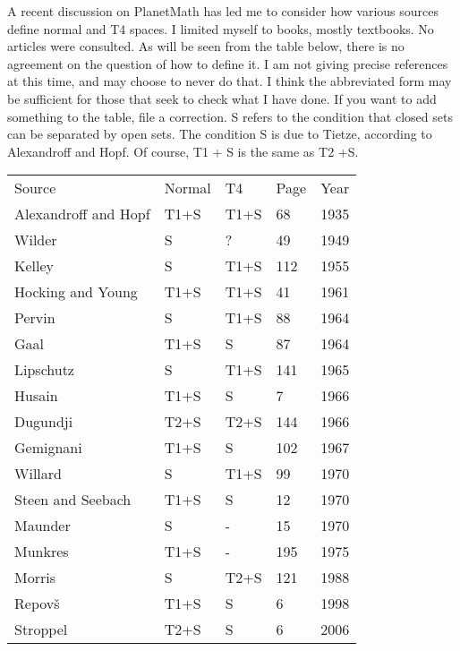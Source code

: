 \documentclass[12pt]{article}
\begin{document}
A recent discussion on PlanetMath has led me to consider how various
sources define normal and T4 spaces. I limited myself to books, mostly textbooks.
No articles were consulted. 
As will be seen from the table below, there is no agreement on
the question of how to define it. I am not giving precise references
at this time, and may choose to never do that. I think the abbreviated
form may be sufficient for those that seek to check what I have done.
If you want to add something to the table, file a correction.
S refers to the condition that closed sets can be separated by open sets.
The condition S is due to Tietze, according to Alexandroff and Hopf.
Of course, T1 + S is the same as T2 +S.

\begin{tabular}{lllll}
\hline 
Source & Normal & T4 & Page & Year \\
Alexandroff and Hopf & T1+S & T1+S & 68 & 1935 \\
Wilder & S &? & 49 & 1949 \\
Kelley & S & T1+S & 112 & 1955 \\
Hocking and Young & T1+S & T1+S & 41 &1961 \\
Pervin & S & T1+S & 88 & 1964 \\
Gaal & T1+S & S & 87 & 1964 \\
Lipschutz & S & T1+S & 141 & 1965 \\
Husain & T1+S & S & 7 & 1966 \\
Dugundji & T2+S & T2+S & 144 & 1966 \\
Gemignani & T1+S & S & 102 & 1967 \\
Willard & S & T1+S  & 99 & 1970 \\
Steen and Seebach & T1+S & S & 12 & 1970 \\
Maunder & S & - & 15 & 1970 \\
Munkres & T1+S & - & 195 & 1975 \\
Morris & S & T2+S & 121 & 1988 \\
Repov\v s & T1+S & S & 6 & 1998 \\
Stroppel & T2+S & S & 6 & 2006 \\
\hline 
\end{tabular}


\end{document}
